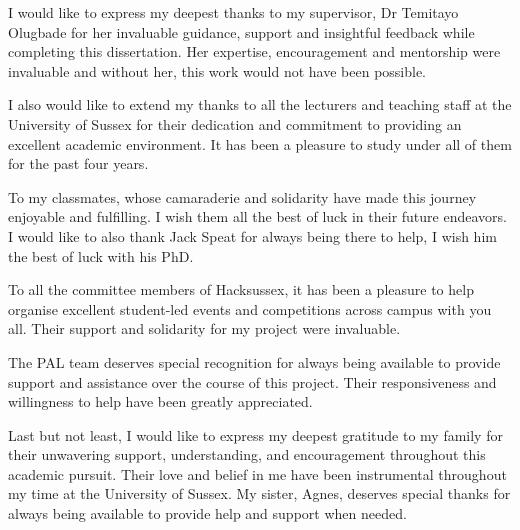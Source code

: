 \documentclass{report}
\begin{document}

I would like to express my deepest thanks to my supervisor, Dr Temitayo Olugbade for her invaluable guidance, support and insightful feedback while completing this dissertation. Her expertise, encouragement and mentorship were invaluable and without her, this work would not have been possible. 

I also would like to extend my thanks to all the lecturers and teaching staff at the University of Sussex for their dedication and commitment to providing an excellent academic environment. It has been a pleasure to study under all of them for the past four years. 

To my classmates, whose camaraderie and solidarity have made this journey enjoyable and fulfilling. I wish them all the best of luck in their future endeavors. I would like to also thank Jack Speat for always being there to help, I wish him the best of luck with his PhD. 

To all the committee members of Hacksussex, it has been a pleasure to help organise excellent student-led events and competitions across campus with you all. Their support and solidarity for my project were invaluable. 

The PAL team deserves special recognition for always being available to provide support and assistance over the course of this project. Their responsiveness and willingness to help have been greatly appreciated.

Last but not least, I would like to express my deepest gratitude to my family for their unwavering support, understanding, and encouragement throughout this academic pursuit. Their love and belief in me have been instrumental throughout my time at the University of Sussex. My sister, Agnes, deserves special thanks for always being available to provide help and support when needed. 
\end{document}
